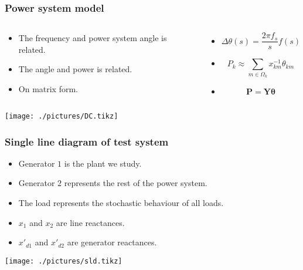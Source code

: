 \begin{frame}
	\frametitle{Power system model}
	\begin{columns}
		\begin{column}{0.5\textwidth}
			\begin{itemize}
				\item The frequency and power system angle is related.
				\item The angle and power is related.
				\item On matrix form.
			\end{itemize}
		\end{column}
		\begin{column}{0.5\textwidth}
			\begin{itemize}
				\item[]
				\begin{equation}
					\Delta \theta(s) = \frac{2\pi f_s}{s}f(s)
				\end{equation}
				\item[]
				\begin{equation}
					P_k \approx \sum_{m\in \Omega_k}{x^{-1}_{km}\theta_{km}}
				\end{equation}
				\item[]
				\begin{equation}
					\mathbf{P}=\mathbf{Y}\mathbf{\theta}
				\end{equation}
			\end{itemize}
		\end{column}
	\end{columns}
	\texttt{[image: ./pictures/DC.tikz]}
\end{frame}
\begin{frame}
	\frametitle{Single line diagram of test system}
	\begin{itemize}
		\item Generator $1$ is the plant we study.
		\item Generator $2$ represents the rest of the power system.
		\item The load represents the stochastic behaviour of all loads.
		\item $x_1$ and $x_2$ are line reactances.
		\item $x'_{d1}$ and $x'_{d2}$ are generator reactances.
	\end{itemize}
		\texttt{[image: ./pictures/sld.tikz]}
\end{frame}
